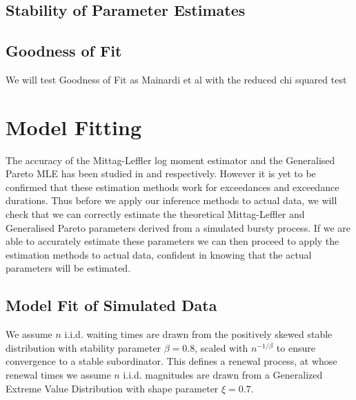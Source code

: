 \documentclass[honours,12pt]{UNSWthesis}
\newcommand{\1}{\mathbf 1}
\numberwithin{equation}{section}
\theoremstyle{definition}
\theoremstyle{remark}
\begin{document}
\section{Stability of Parameter Estimates}
\section{Goodness of Fit}%
We will test Goodness of Fit as Mainardi et al with the reduced chi squared test
\chapter{Model Fitting}
The accuracy of the Mittag-Leffler log moment estimator and the Generalised Pareto MLE has been studied 
in \cite{Cahoy2013} and \cite{GPaccuracyCitation} respectively. However it is yet to be confirmed that these estimation methods work for exceedances and exceedance durations. Thus before we apply our inference methods to actual data, we will check that we can correctly estimate the theoretical Mittag-Leffler and Generalised Pareto parameters derived from a simulated bursty process. If we are able to accurately estimate these parameters we can then proceed to apply the estimation methods to actual data, confident in knowing that the actual parameters will be estimated.

\section{Model Fit of Simulated Data}
We assume $n$ i.i.d. waiting times are drawn from the positively skewed stable
distribution with stability parameter $\beta=0.8$, scaled with 
$n^{-1/\beta}$ to ensure convergence to a stable subordinator. This defines a renewal process, at whose renewal times we assume $n$ i.i.d. magnitudes are drawn from a Generalized Extreme Value Distribution
with shape parameter $\xi = 0.7$.
	
\end{document}
